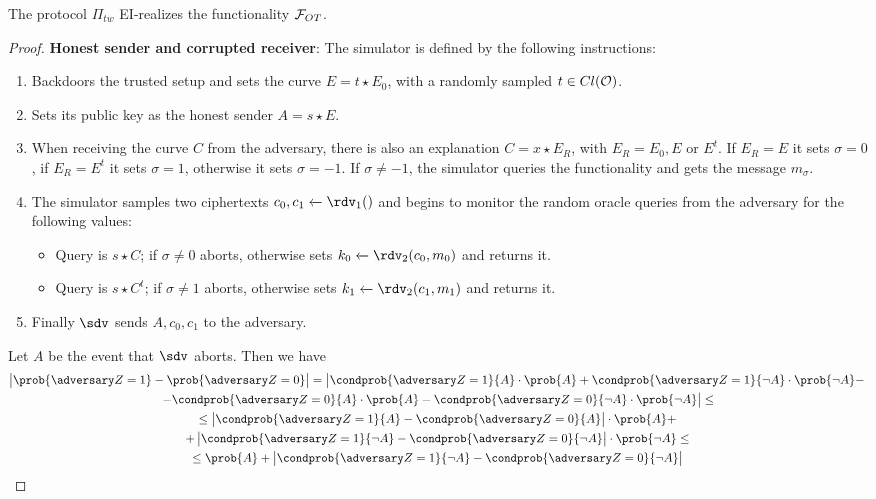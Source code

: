 \begin{theorem}
    The protocol $\Pi_{tw}$ EI-realizes the functionality $\mathcal{F}_{OT}$.
\end{theorem}
\begin{proof}
    \textbf{Honest sender and corrupted receiver}: The simulator is defined by the following instructions:
    \begin{enumerate}
        \item Backdoors the trusted setup and sets the curve $E=t\star E_0$, with a randomly sampled $t\in Cl(\mathcal{O})$.
        \item Sets its public key as the honest sender $A=s\star E$.
        \item When receiving the curve $C$ from the adversary, there is also an explanation $C=x\star E_R$, with $E_R=E_0,E$ or $E^t$. If $E_R=E$ it sets $\sigma=0$, if $E_R=E^t$ it sets $\sigma=1$, otherwise it sets $\sigma=-1$. If $\sigma\neq -1$, the simulator queries the functionality and gets the message $m_\sigma$.
        \item The simulator samples two ciphertexts $c_0,c_1\xleftarrow{}\rdv_1()$ and begins to monitor the random oracle queries from the adversary for the following values:
        \begin{itemize}
            \item Query is $s\star C$; if $\sigma\neq0$ aborts, otherwise sets $k_0\xleftarrow{}\rdv_2(c_0,m_0)$ and returns it.
            \item Query is $s\star C^t$; if $\sigma\neq1$ aborts, otherwise sets $k_1\xleftarrow{}\rdv_2(c_1,m_1)$ and returns it.
        \end{itemize}
        \item Finally $\sdv$ sends $A,c_0,c_1$ to the adversary.
    \end{enumerate}
    
    Let $A$ be the event that $\sdv$ aborts. Then we have
    \begin{multline*}
        \left|\prob{\zdv=1}-\prob{\zdv=0}\right| = \left|\condprob{\zdv=1}{A}\cdot\prob{A} + \condprob{\zdv=1}{\neg A}\cdot\prob{\neg A} -\right.\\\left.- \condprob{\zdv=0}{A}\cdot\prob{A} - \condprob{\zdv=0}{\neg A}\cdot\prob{\neg A}\right|\le\\
        \le \left| \condprob{\zdv=1}{A} - \condprob{\zdv=0}{A}\right|\cdot\prob{A}  +\\
        + \left| \condprob{\zdv=1}{\neg A} - \condprob{\zdv=0}{\neg A}\right|\cdot\prob{\neg A} \le \\
        \le \prob{A} + \left| \condprob{\zdv=1}{\neg A} - \condprob{\zdv=0}{\neg A}\right|
    \end{multline*}


\end{proof}
